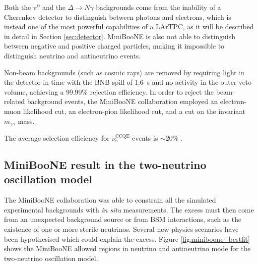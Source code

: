 Both the $\pi^0$ and the $\Delta\to N\gamma$ backgrounds come from the inability of a Cherenkov detector to distinguish between photons and electrons, which is instead one of the most powerful capabilities of a LArTPC, as it will be described in detail in Section \ref{sec:detector}. MiniBooNE is also not able to distinguish between negative and positive charged particles, making it impossible to distinguish neutrino and antineutrino events.

Non-beam backgrounds (such as cosmic rays) are removed by requiring light in the detector in time with the BNB spill of 1.6~\si{\micro}s and no activity in the outer veto volume, achieving a 99.99\% rejection efficiency. 
In order to reject the beam-related background events, the MiniBooNE collaboration employed an electron-muon likelihood cut, an electron-pion likelihood cut, and a cut on the invariant $m_{\gamma\gamma}$ mass.

The average selection efficiency for $\nu_e^{\mathrm{CCQE}}$ events is $\sim20$\% \cite{Aguilar-Arevalo:2018gpe}.

\subsection*{MiniBooNE result in the two-neutrino oscillation model}
The MiniBooNE collaboration was able to constrain all the simulated experimental backgrounds with \emph{in situ} measurements. The excess must then come from an unexpected background source or from BSM interactions, such as the existence of one or more sterile neutrinos.
Several new physics scenarios have been hypothesised which could explain the excess. Figure \ref{fig:miniboone_bestfit} shows the MiniBooNE allowed regions in neutrino and antineutrino mode for the two-neutrino oscillation model. 

